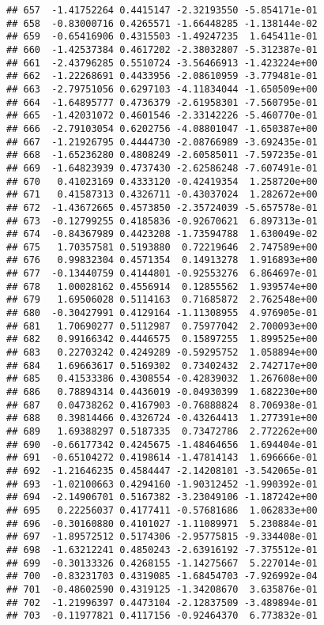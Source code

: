 \documentclass[
]{article}
\begin{document}
\begin{verbatim}
## 657  -1.41752264 0.4415147 -2.32193550 -5.854171e-01
## 658  -0.83000716 0.4265571 -1.66448285 -1.138144e-02
## 659  -0.65416906 0.4315503 -1.49247235  1.645411e-01
## 660  -1.42537384 0.4617202 -2.38032807 -5.312387e-01
## 661  -2.43796285 0.5510724 -3.56466913 -1.423224e+00
## 662  -1.22268691 0.4433956 -2.08610959 -3.779481e-01
## 663  -2.79751056 0.6297103 -4.11834044 -1.650509e+00
## 664  -1.64895777 0.4736379 -2.61958301 -7.560795e-01
## 665  -1.42031072 0.4601546 -2.33142226 -5.460770e-01
## 666  -2.79103054 0.6202756 -4.08801047 -1.650387e+00
## 667  -1.21926795 0.4444730 -2.08766989 -3.692435e-01
## 668  -1.65236280 0.4808249 -2.60585011 -7.597235e-01
## 669  -1.64823939 0.4737430 -2.62586248 -7.607491e-01
## 670   0.41023169 0.4333120 -0.42419354  1.258720e+00
## 671   0.41587313 0.4326711 -0.43037024  1.282672e+00
## 672  -1.43672665 0.4573850 -2.35724039 -5.657578e-01
## 673  -0.12799255 0.4185836 -0.92670621  6.897313e-01
## 674  -0.84367989 0.4423208 -1.73594788  1.630049e-02
## 675   1.70357581 0.5193880  0.72219646  2.747589e+00
## 676   0.99832304 0.4571354  0.14913278  1.916893e+00
## 677  -0.13440759 0.4144801 -0.92553276  6.864697e-01
## 678   1.00028162 0.4556914  0.12855562  1.939574e+00
## 679   1.69506028 0.5114163  0.71685872  2.762548e+00
## 680  -0.30427991 0.4129164 -1.11308955  4.976905e-01
## 681   1.70690277 0.5112987  0.75977042  2.700093e+00
## 682   0.99166342 0.4446575  0.15897255  1.899525e+00
## 683   0.22703242 0.4249289 -0.59295752  1.058894e+00
## 684   1.69663617 0.5169302  0.73402432  2.742717e+00
## 685   0.41533386 0.4308554 -0.42839032  1.267608e+00
## 686   0.78894314 0.4436019 -0.04930399  1.682230e+00
## 687   0.04738262 0.4167903 -0.76888824  8.706938e-01
## 688   0.39814466 0.4326724 -0.43264413  1.277391e+00
## 689   1.69388297 0.5187335  0.73472786  2.772262e+00
## 690  -0.66177342 0.4245675 -1.48464656  1.694404e-01
## 691  -0.65104272 0.4198614 -1.47814143  1.696666e-01
## 692  -1.21646235 0.4584447 -2.14208101 -3.542065e-01
## 693  -1.02100663 0.4294160 -1.90312452 -1.990392e-01
## 694  -2.14906701 0.5167382 -3.23049106 -1.187242e+00
## 695   0.22256037 0.4177411 -0.57681686  1.062833e+00
## 696  -0.30160880 0.4101027 -1.11089971  5.230884e-01
## 697  -1.89572512 0.5174306 -2.95775815 -9.334408e-01
## 698  -1.63212241 0.4850243 -2.63916192 -7.375512e-01
## 699  -0.30133326 0.4268155 -1.14275667  5.227014e-01
## 700  -0.83231703 0.4319085 -1.68454703 -7.926992e-04
## 701  -0.48602590 0.4319125 -1.34208670  3.635876e-01
## 702  -1.21996397 0.4473104 -2.12837509 -3.489894e-01
## 703  -0.11977821 0.4117156 -0.92464370  6.773832e-01

\end{verbatim}
\end{document}
